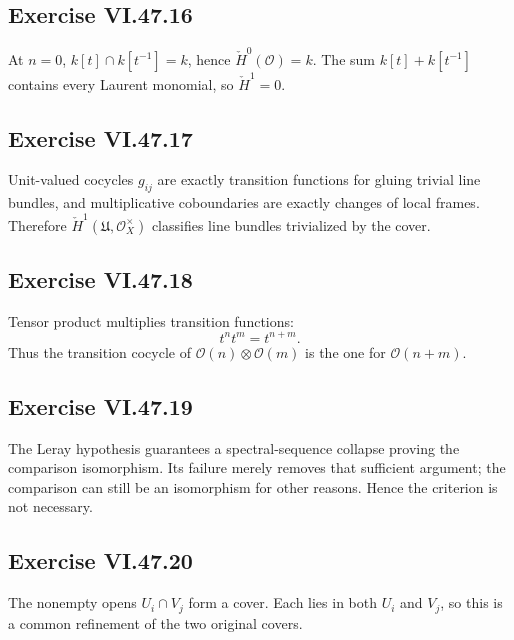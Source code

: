 \subsection*{Exercise VI.47.16}
\begin{solution}
At \(n=0\), \(k[t]\cap k[t^{-1}]=k\), hence \(\check H^0(\mathcal O)=k\).  The sum \(k[t]+k[t^{-1}]\) contains every Laurent monomial, so \(\check H^1=0\).
\end{solution}

\subsection*{Exercise VI.47.17}
\begin{solution}
Unit-valued cocycles \(g_{ij}\) are exactly transition functions for gluing trivial line bundles, and multiplicative coboundaries are exactly changes of local frames.  Therefore \(\check H^1(\mathfrak U,\mathcal O_X^\times)\) classifies line bundles trivialized by the cover.
\end{solution}

\subsection*{Exercise VI.47.18}
\begin{solution}
Tensor product multiplies transition functions:
\[
t^n t^m=t^{n+m}.
\]
Thus the transition cocycle of \(\mathcal O(n)\otimes\mathcal O(m)\) is the one for \(\mathcal O(n+m)\).
\end{solution}

\subsection*{Exercise VI.47.19}
\begin{solution}
The Leray hypothesis guarantees a spectral-sequence collapse proving the comparison isomorphism.  Its failure merely removes that sufficient argument; the comparison can still be an isomorphism for other reasons.  Hence the criterion is not necessary.
\end{solution}

\subsection*{Exercise VI.47.20}
\begin{solution}
The nonempty opens \(U_i\cap V_j\) form a cover.  Each lies in both \(U_i\) and \(V_j\), so this is a common refinement of the two original covers.
\end{solution}

